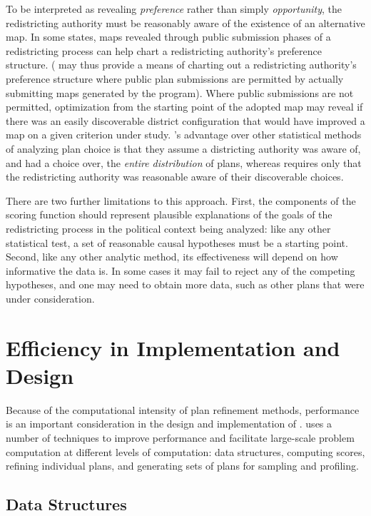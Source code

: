\documentclass[article]{JSSstyle/jss}
\begin{document}
To be interpreted as revealing \textit{preference} 
rather than simply \textit{opportunity}, the redistricting authority must be reasonably aware
of the existence of an alternative map.  In some states, maps revealed through 
public submission phases of a redistricting process can help chart a redistricting authority's preference
structure. ( may thus provide a means of charting out a redistricting authority's preference structure
where public plan submissions are permitted by actually submitting maps generated by the program).  
Where public submissions are not permitted, optimization from the starting point of the adopted map may reveal if there was an easily discoverable district configuration that would have improved
a map on a given criterion under study. 's advantage over other
statistical methods of analyzing plan choice is that they assume a districting authority was aware of, and had a choice over, the
\textit{entire distribution} of plans, whereas  requires only that the redistricting authority was reasonable aware of their discoverable choices.

There are two further limitations to this approach.  First, the components of the scoring function 
should represent plausible explanations of the goals of
the redistricting process in the political context being analyzed: like
any other statistical test, a set of reasonable causal hypotheses must
be a starting point. Second, like any other analytic method, its
effectiveness will depend on how informative the data is. In some cases
it may fail to reject any of the competing hypotheses, and one may need
to obtain more data, such as other plans that were under consideration.

\section{Efficiency in Implementation and Design}

Because of the computational intensity of plan refinement methods, performance 
is an important consideration in the design and implementation of .  uses a number
of techniques to improve performance and facilitate large-scale problem computation 
at different levels of computation: data structures, computing scores, refining 
individual plans, and generating sets of plans for sampling and profiling. 

\subsection{Data Structures}
\end{document}

